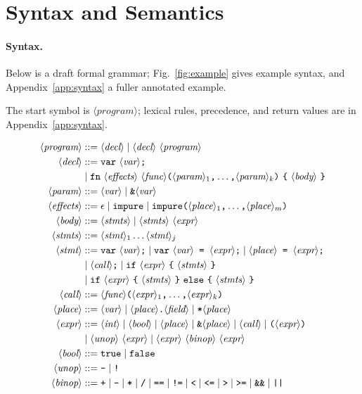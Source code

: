\documentclass[12pt, letterpaper]{article}
\newcommand{\ttlbrace}{\texttt{\char`\{}}
\newcommand{\ttrbrace}{\texttt{\char`\}}}
\newcommand{\nt}[1]{\ensuremath{\langle\textit{#1}\rangle}}
\begin{document}
\section{Syntax and Semantics}

\paragraph{Syntax.} Below is a draft formal grammar; Fig.~\ref{fig:example} gives example syntax, and Appendix~\ref{app:syntax} a fuller annotated example.

The start symbol is \nt{program}; lexical rules, precedence, and return values are in Appendix~\ref{app:syntax}.

\begin{align*}
  \nt{program} &::= \nt{decl} \mid \nt{decl}\ \nt{program} \\
  \nt{decl} &::= \texttt{var}\ \nt{var}\texttt{;} \\
    &\mid \texttt{fn}\ \nt{effects}\ \nt{func}\texttt{(}\nt{param}_1\texttt{,} \dots\texttt{,} \nt{param}_k\texttt{)}\ \ttlbrace\ \nt{body}\ \ttrbrace \\
  \nt{param} &::= \nt{var} \mid \texttt{\&}\nt{var} \\
  \nt{effects} &::= \epsilon
     \mid \texttt{impure}
     \mid \texttt{impure(}\nt{place}_1\texttt{,} \dots\texttt{,} \nt{place}_m\texttt{)} \\
  \nt{body} &::= \nt{stmts} \mid \nt{stmts}\ \nt{expr} \\
  \nt{stmts} &::= \nt{stmt}_1 \dots \nt{stmt}_j \\
  \nt{stmt} &::= \texttt{var}\ \nt{var}\texttt{;}
     \mid \texttt{var}\ \nt{var} \texttt{ = } \nt{expr}\texttt{;}
     \mid \nt{place} \texttt{ = } \nt{expr}\texttt{;} \\
    &\mid \nt{call}\texttt{;}
     \mid \texttt{if}\ \nt{expr}\ \ttlbrace\ \nt{stmts}\ \ttrbrace \\
    &\mid \texttt{if}\ \nt{expr}\ \ttlbrace\ \nt{stmts}\ \ttrbrace\ \texttt{else}\ \ttlbrace\ \nt{stmts}\ \ttrbrace \\
  \nt{call} &::= \nt{func}\texttt{(}\nt{expr}_1\texttt{,} \dots\texttt{,} \nt{expr}_k\texttt{)} \\
  \nt{place} &::= \nt{var} \mid \nt{place}\texttt{.}\nt{field} \mid \texttt{*}\nt{place} \\
  \nt{expr} &::= \nt{int} \mid \nt{bool} \mid \nt{place} \mid \texttt{\&}\nt{place} \mid \nt{call}
     \mid \texttt{(}\nt{expr}\texttt{)} \\
    &\mid \nt{unop}\ \nt{expr} \mid \nt{expr}\ \nt{binop}\ \nt{expr} \\
  \nt{bool} &::= \texttt{true} \mid \texttt{false} \\
  \nt{unop} &::= \texttt{-} \mid \texttt{!} \\
  \nt{binop} &::= \texttt{+} \mid \texttt{-} \mid \texttt{*} \mid \texttt{/}
     \mid \texttt{==} \mid \texttt{!=} \mid \texttt{<} \mid \texttt{<=} \mid \texttt{>} \mid \texttt{>=}
     \mid \texttt{\&\&} \mid \texttt{||}
\end{align*}
\end{document}
